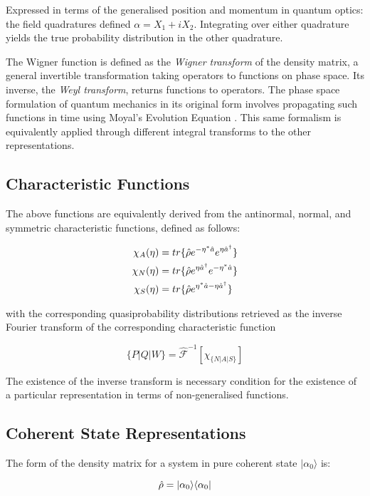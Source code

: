Expressed in terms of the generalised position and momentum in quantum optics: the field quadratures defined $\alpha = X_1 + iX_2$.
Integrating over either quadrature yields the true probability distribution in the other quadrature.

The Wigner function is defined as the \emph{Wigner transform} of the density matrix, a general invertible transformation taking operators to functions on phase space.
Its inverse, the \emph{Weyl transform}, returns functions to operators.
The phase space formulation of quantum mechanics in its original form involves propagating such functions in time using Moyal's Evolution Equation \cite{Curtright2011}.
This same formalism is equivalently applied  through different integral transforms to the other representations.

\subsection{Characteristic Functions}
The above functions are equivalently derived from the antinormal, normal, and symmetric characteristic functions, defined as follows:

\begin{align}
	\chi_{A} (\eta) &= tr\{\hat{\rho} e^{-\eta^* \hat{a}}e^{\eta \hat{a}^\dagger } \} \\
	\chi_{N} (\eta) &= tr\{\hat{\rho} e^{\eta \hat{a}^\dagger}e^{-\eta^* \hat{a} } \} \\
	\chi_{S} (\eta) &= tr\{\hat{\rho} e^{\eta^* \hat{a}-\eta \hat{a}^\dagger } \}
\end{align}

with the corresponding quasiprobability distributions retrieved as the inverse Fourier transform of the corresponding characteristic function

\begin{equation}
 	\{P|Q|W\} = \hat{\mathscr{F}}^{-1} [\chi_{\{N|A|S\}}]
\end{equation}

The existence of the inverse transform is necessary condition for the existence of a particular representation in terms of non-generalised functions.

\subsection{Coherent State Representations}
The form of the density matrix for a system in pure coherent state $ | \alpha_0 \rangle $  is:

\begin{equation}
 	\hat{\rho} = | \alpha_0 \rangle \langle \alpha_0 |
\end{equation}

